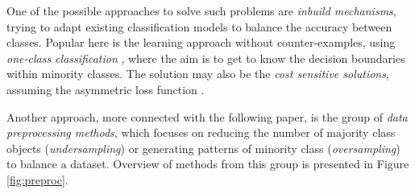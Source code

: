 \documentclass[pmlr]{jmlr}
\begin{document}
One of the possible approaches to solve such problems are \emph{inbuild mechanisms}, trying to adapt existing classification models to balance the accuracy between classes. Popular here is the learning approach without counter-examples, using \emph{one-class classification} \citep{Japkowicz:1995, Krawczyk:2014ins}, where the aim is to get to know the decision boundaries within minority classes. The solution may also be the \emph{cost sensitive solutions}, assuming the asymmetric loss function \citep{Lopez:2012,He:2009}.

Another approach, more connected with the following paper, is the group of \emph{data preprocessing methods}, which focuses on reducing the number of majority class objects (\emph{undersampling}) or generating patterns of minority class (\emph{oversampling}) to balance a dataset. Overview of methods from this group is presented in Figure \ref{fig:preproc}. 
\end{document}
